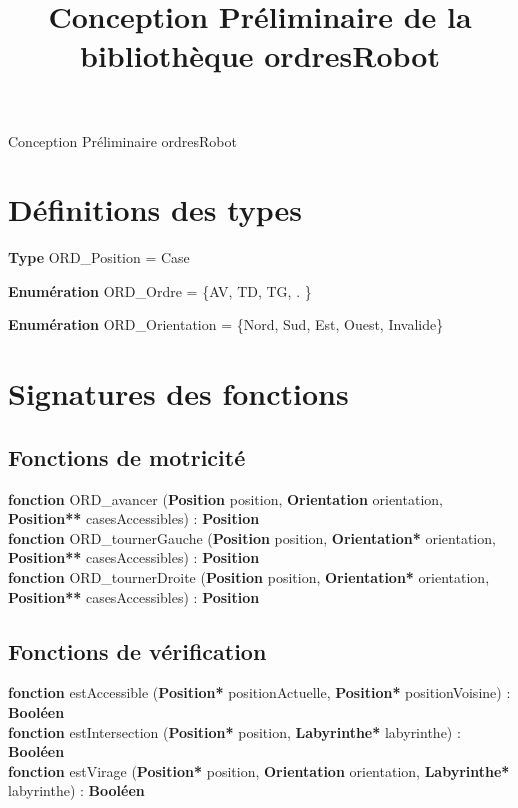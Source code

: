 \documentclass[a4paper, 11pt]{article}
\title{Conception Préliminaire de la bibliothèque ordresRobot}
\author{}
\date{}
\begin{document}
%
%
\selectfont
\begin{center}
    \Huge{Conception Préliminaire ordresRobot}\\
\end{center}


\section*{Définitions des types}

\indent\textbf{Type} ORD\_Position = Case

\indent\textbf{Enumération} ORD\_Ordre = \{AV, TD, TG, . \}

\indent\textbf{Enumération} ORD\_Orientation = \{Nord, Sud, Est, Ouest, Invalide\}


\section*{Signatures des fonctions}

\subsection*{Fonctions de motricité}

\noindent\textbf{fonction} ORD\_avancer (\textbf{Position} position, \textbf{Orientation} orientation, \textbf{Position**} casesAccessibles) : \textbf{Position}\\
\noindent\textbf{fonction} ORD\_tournerGauche (\textbf{Position} position, \textbf{Orientation*} orientation, \textbf{Position**} casesAccessibles) : \textbf{Position}\\
\noindent\textbf{fonction} ORD\_tournerDroite (\textbf{Position} position, \textbf{Orientation*} orientation, \textbf{Position**} casesAccessibles) : \textbf{Position}\

\subsection*{Fonctions de vérification}
\noindent\textbf{fonction} estAccessible (\textbf{Position*} positionActuelle, \textbf{Position*} positionVoisine) : \textbf{Booléen}\\
\noindent\textbf{fonction} estIntersection (\textbf{Position*} position, \textbf{Labyrinthe*} labyrinthe) : \textbf{Booléen}\\
\noindent\textbf{fonction} estVirage (\textbf{Position*} position, \textbf{Orientation} orientation, \textbf{Labyrinthe*} labyrinthe) : \textbf{Booléen}\\
\end{document}
